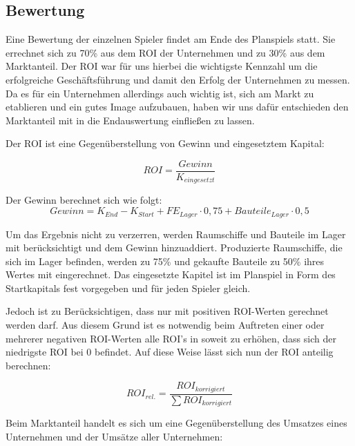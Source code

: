 \subsection{Bewertung}
\label{sub:spielwelt-logik-bewertung}

Eine Bewertung der einzelnen Spieler findet am Ende des Planspiels statt. Sie errechnet sich zu 70\% aus dem
ROI der Unternehmen und zu 30\% aus dem Marktanteil. Der ROI war für uns hierbei die wichtigste Kennzahl um die
erfolgreiche Geschäftsführung und damit den Erfolg der Unternehmen zu messen. Da es für ein Unternehmen allerdings
auch wichtig ist, sich am Markt zu etablieren und ein gutes Image aufzubauen, haben wir uns dafür entschieden den
Marktanteil mit in die Endauswertung einfließen zu lassen.

Der ROI ist eine Gegenüberstellung von Gewinn und eingesetztem Kapital:

\begin{equation}
     ROI = \frac{Gewinn}{K_{eingesetzt}}
     \label{alg:spielwelt-logik-bewertung-ROI}
\end{equation}

Der Gewinn berechnet sich wie folgt:
\begin{equation}
     Gewinn = K_{End} - K_{Start} + FE_{Lager} \cdot 0,75 + Bauteile_{Lager} \cdot 0,5
     \label{alg:spielwelt-logik-bewertung-Gewinn}
\end{equation}

Um das Ergebnis nicht zu verzerren, werden Raumschiffe und Bauteile im Lager mit berücksichtigt und dem Gewinn hinzuaddiert.
Produzierte Raumschiffe, die sich im Lager befinden, werden zu 75\% und gekaufte Bauteile zu 50\% ihres Wertes mit eingerechnet.
Das eingesetzte Kapitel ist im Planspiel in Form des Startkapitals fest vorgegeben und für jeden Spieler gleich.

Jedoch ist zu Berücksichtigen, dass nur mit positiven ROI-Werten gerechnet werden darf. Aus diesem Grund ist es notwendig
beim Auftreten einer oder mehrerer negativen ROI-Werten alle ROI's in soweit zu erhöhen, dass sich der niedrigste ROI bei
0 befindet. Auf diese Weise lässt sich nun der ROI anteilig berechnen:

\begin{equation}
     ROI_{rel.} = \frac{ROI_{korrigiert}}{\sum ROI_{korrigiert}}
     \label{alg:spielwelt-logik-bewertung-rel. ROI}
\end{equation}

Beim Marktanteil handelt es sich um eine Gegenüberstellung des Umsatzes eines Unternehmen und der Umsätze aller Unternehmen:

